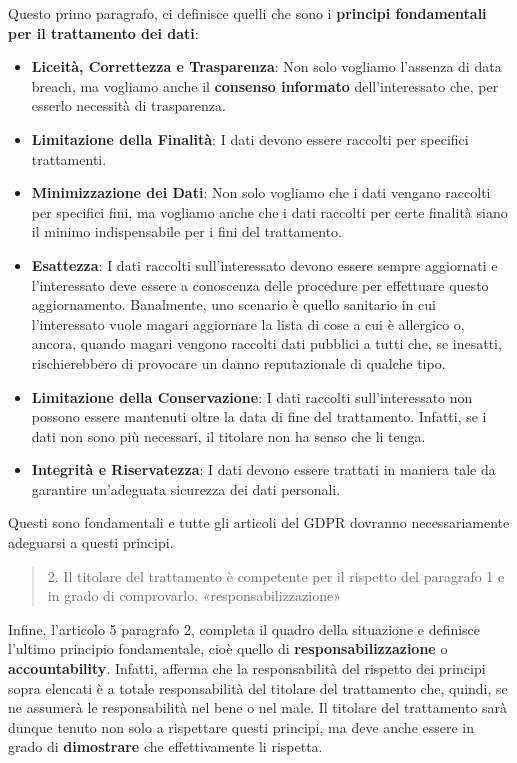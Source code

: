 Questo primo paragrafo, ci definisce quelli che sono i \textbf{principi fondamentali per il trattamento dei dati}:
\begin{itemize}
    \item \textbf{Liceità, Correttezza e Trasparenza}: Non solo vogliamo l'assenza di data breach, ma vogliamo anche il \textbf{consenso informato} dell'interessato che, per esserlo necessità di trasparenza.
    \item \textbf{Limitazione della Finalità}: I dati devono essere raccolti per specifici trattamenti.
    \item \textbf{Minimizzazione dei Dati}: Non solo vogliamo che i dati vengano raccolti per specifici fini, ma vogliamo anche che i dati raccolti per certe finalità siano il minimo indispensabile per i fini del trattamento.
    \item \textbf{Esattezza}: I dati raccolti sull'interessato devono essere sempre aggiornati e l'interessato deve essere a conoscenza delle procedure per effettuare questo aggiornamento. Banalmente, uno scenario è quello sanitario in cui l'interessato vuole magari aggiornare la lista di cose a cui è allergico o, ancora, quando magari vengono raccolti dati pubblici a tutti che, se inesatti, rischierebbero di provocare un danno reputazionale di qualche tipo.
    \item \textbf{Limitazione della Conservazione}: I dati raccolti sull'interessato non possono essere mantenuti oltre la data di fine del trattamento. Infatti, se i dati non sono più necessari, il titolare non ha senso che li tenga.
    \item \textbf{Integrità e Riservatezza}: I  dati devono essere trattati in maniera tale da garantire un'adeguata sicurezza dei dati personali.
\end{itemize}
Questi sono fondamentali e tutte gli articoli del GDPR dovranno necessariamente adeguarsi a questi principi.
\begin{quote}
    2. Il titolare del trattamento è competente per il rispetto del paragrafo 1 e in grado di comprovarlo. «responsabilizzazione»
\end{quote}
Infine, l'articolo 5 paragrafo 2, completa il quadro della situazione e definisce l'ultimo principio fondamentale, cioè quello di \textbf{responsabilizzazione} o \textbf{accountability}.
Infatti, afferma che la responsabilità del rispetto dei principi sopra elencati è a totale responsabilità del titolare del trattamento che, quindi, se ne assumerà le responsabilità nel bene o nel male.
Il titolare del trattamento sarà dunque tenuto non solo a rispettare questi principi, ma deve anche essere in grado di \textbf{dimostrare} che effettivamente li rispetta.
